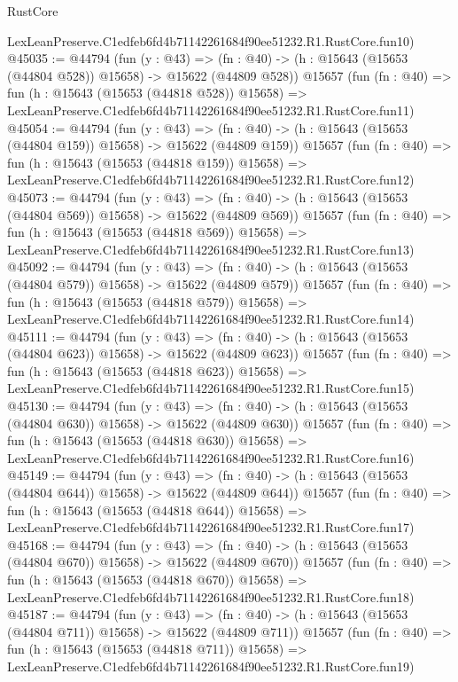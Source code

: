 \begin{lexlean}{RustCore}
\begin{coremodule}
    LexLeanPreserve.C1edfeb6fd4b71142261684f90ee51232.R1.RustCore.fun10)
@45035 := @44794
    (fun (y : @43) =>
    (fn : @40) -> (h : @15643 (@15653 (@44804 @528)) @15658) -> @15622 (@44809 @528))
    @15657
    (fun (fn : @40) =>
    fun (h : @15643 (@15653 (@44818 @528)) @15658) =>
    LexLeanPreserve.C1edfeb6fd4b71142261684f90ee51232.R1.RustCore.fun11)
@45054 := @44794
    (fun (y : @43) =>
    (fn : @40) -> (h : @15643 (@15653 (@44804 @159)) @15658) -> @15622 (@44809 @159))
    @15657
    (fun (fn : @40) =>
    fun (h : @15643 (@15653 (@44818 @159)) @15658) =>
    LexLeanPreserve.C1edfeb6fd4b71142261684f90ee51232.R1.RustCore.fun12)
@45073 := @44794
    (fun (y : @43) =>
    (fn : @40) -> (h : @15643 (@15653 (@44804 @569)) @15658) -> @15622 (@44809 @569))
    @15657
    (fun (fn : @40) =>
    fun (h : @15643 (@15653 (@44818 @569)) @15658) =>
    LexLeanPreserve.C1edfeb6fd4b71142261684f90ee51232.R1.RustCore.fun13)
@45092 := @44794
    (fun (y : @43) =>
    (fn : @40) -> (h : @15643 (@15653 (@44804 @579)) @15658) -> @15622 (@44809 @579))
    @15657
    (fun (fn : @40) =>
    fun (h : @15643 (@15653 (@44818 @579)) @15658) =>
    LexLeanPreserve.C1edfeb6fd4b71142261684f90ee51232.R1.RustCore.fun14)
@45111 := @44794
    (fun (y : @43) =>
    (fn : @40) -> (h : @15643 (@15653 (@44804 @623)) @15658) -> @15622 (@44809 @623))
    @15657
    (fun (fn : @40) =>
    fun (h : @15643 (@15653 (@44818 @623)) @15658) =>
    LexLeanPreserve.C1edfeb6fd4b71142261684f90ee51232.R1.RustCore.fun15)
@45130 := @44794
    (fun (y : @43) =>
    (fn : @40) -> (h : @15643 (@15653 (@44804 @630)) @15658) -> @15622 (@44809 @630))
    @15657
    (fun (fn : @40) =>
    fun (h : @15643 (@15653 (@44818 @630)) @15658) =>
    LexLeanPreserve.C1edfeb6fd4b71142261684f90ee51232.R1.RustCore.fun16)
@45149 := @44794
    (fun (y : @43) =>
    (fn : @40) -> (h : @15643 (@15653 (@44804 @644)) @15658) -> @15622 (@44809 @644))
    @15657
    (fun (fn : @40) =>
    fun (h : @15643 (@15653 (@44818 @644)) @15658) =>
    LexLeanPreserve.C1edfeb6fd4b71142261684f90ee51232.R1.RustCore.fun17)
@45168 := @44794
    (fun (y : @43) =>
    (fn : @40) -> (h : @15643 (@15653 (@44804 @670)) @15658) -> @15622 (@44809 @670))
    @15657
    (fun (fn : @40) =>
    fun (h : @15643 (@15653 (@44818 @670)) @15658) =>
    LexLeanPreserve.C1edfeb6fd4b71142261684f90ee51232.R1.RustCore.fun18)
@45187 := @44794
    (fun (y : @43) =>
    (fn : @40) -> (h : @15643 (@15653 (@44804 @711)) @15658) -> @15622 (@44809 @711))
    @15657
    (fun (fn : @40) =>
    fun (h : @15643 (@15653 (@44818 @711)) @15658) =>
    LexLeanPreserve.C1edfeb6fd4b71142261684f90ee51232.R1.RustCore.fun19)

\end{coremodule}
\end{lexlean}
